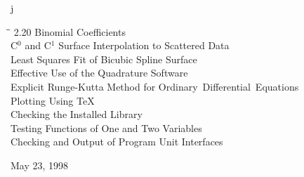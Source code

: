 \documentclass[twoside]{MATH77}
\begin{document}
\if j\outtyp
\begin{tabbing}
\hspace{1.in}\=\hspace{.5in}\=\kill
\> \phantom{1}2.20 \> Binomial Coefficients\\
 \> C$^0$ and C$^1$ Surface Interpolation to Scattered Data\\
 \> Least Squares Fit of Bicubic Spline Surface\\
 \> Effective Use of the Quadrature Software\\
 \> Explicit Runge-Kutta Method for Ordinary~Differential~Equations\\
 \> Plotting Using \TeX \\
 \> Checking the Installed Library\\
 \> Testing Functions of One and Two Variables\\
 \> Checking and Output of Program Unit Interfaces\\[-25pt]
\end{tabbing}
\hspace{.75in}May 23, 1998
\fi
\newpage
\end{document}
